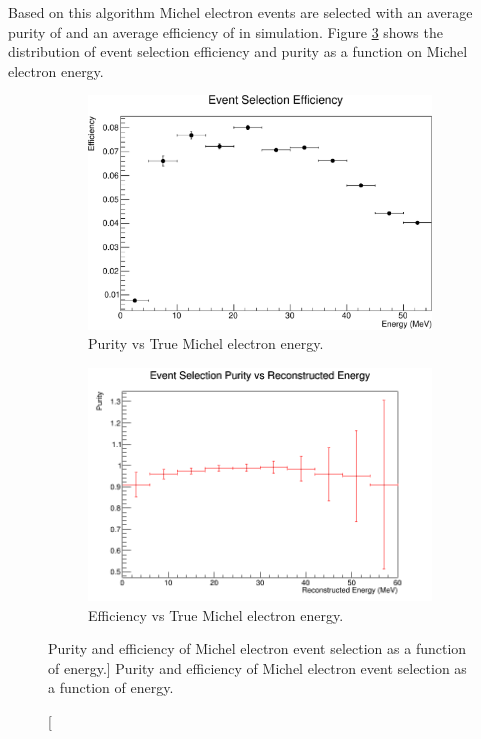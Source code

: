 Based on this algorithm Michel electron events are selected with an average
purity of  and an average efficiency of  
in \protodune{} simulation. Figure \ref{fig:eff_and_pur} shows the
distribution of event selection efficiency and purity as a function on Michel
electron energy. 
\begin{figure}
	\centering
	\begin{subfigure}[b]{\textwidth}
		\includegraphics[width=\textwidth, height=0.68\textwidth]{figures/eff_v_energy.pdf}
		\caption[Purity vs True Michel electron energy.]{Purity vs True Michel
		electron energy.}
		\label{fig:eff_v_energy}
	\end{subfigure}
	\begin{subfigure}[b]{\textwidth}
		\includegraphics[width=\textwidth]{figures/MC_purity_v_energy.png}
		\caption[Efficiency vs True Michel electron energy.]{Efficiency vs True Michel
		electron energy.}
		\label{fig:pur_v_energy}
	\end{subfigure}

	\caption
	[Purity and efficiency of Michel electron event selection as a function of
	energy.]
	{Purity and efficiency of Michel electron event selection as a function of
	energy.}

	\label{fig:eff_and_pur}

\end{figure}

